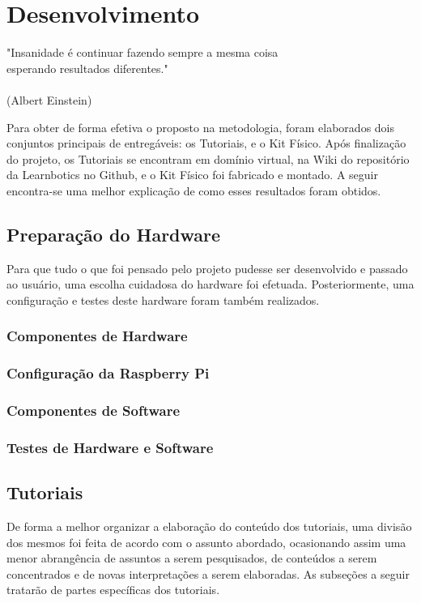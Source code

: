 \chapter{Desenvolvimento}
\label{chap:desen_test}
\begin{flushright}
	"Insanidade é continuar fazendo sempre a mesma coisa \\ 
	esperando resultados diferentes." \\
	\ \\
	(Albert Einstein)
\end{flushright}

Para obter de forma efetiva o proposto na metodologia, foram elaborados dois conjuntos principais de entregáveis: os Tutoriais, e o Kit Físico. Após finalização do projeto, os Tutoriais se encontram em domínio virtual, na Wiki do repositório da Learnbotics no Github, e o Kit Físico foi fabricado e montado. A seguir encontra-se uma melhor explicação de como esses resultados foram obtidos.

\section{Preparação do Hardware}
Para que tudo o que foi pensado pelo projeto pudesse ser desenvolvido e passado ao usuário, uma escolha cuidadosa do hardware foi efetuada. Posteriormente, uma configuração e testes deste hardware foram também realizados.

\subsection{Componentes de Hardware}

\subsection{Configuração da Raspberry Pi}

\subsection{Componentes de Software}

\subsection{Testes de Hardware e Software}

\section{Tutoriais}
De forma a melhor organizar a elaboração do conteúdo dos tutoriais, uma divisão dos mesmos foi feita de acordo com o assunto abordado, ocasionando assim uma menor abrangência de assuntos a serem pesquisados, de conteúdos a serem concentrados e de novas interpretações a serem elaboradas. As subseções a seguir tratarão de partes específicas dos tutoriais.

